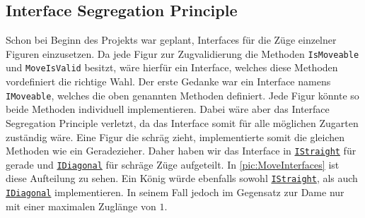 \documentclass[
10pt, %
a4paper, %
oneside, %
headinclude,footinclude, %
BCOR5mm, %
]{scrartcl}
\begin{document}
\begin{onehalfspace}
\subsection{Interface Segregation Principle}
Schon bei Beginn des Projekts war geplant, Interfaces für die Züge einzelner Figuren einzusetzen. Da jede Figur zur Zugvalidierung die Methoden \texttt{IsMoveable} und \texttt{MoveIsValid} besitzt, wäre hierfür ein Interface, welches diese Methoden vordefiniert die richtige Wahl. Der erste Gedanke war ein Interface namens \texttt{IMoveable}, welches die oben genannten Methoden definiert. Jede Figur könnte so beide Methoden individuell implementieren. Dabei wäre aber das Interface Segregation Principle verletzt, da das Interface somit für alle möglichen Zugarten zuständig wäre. Eine Figur die schräg zieht, implementierte somit die gleichen Methoden wie ein Geradezieher. Daher haben wir das Interface in \texttt{\href{https://github.com/schmida736/Chess-AdvancedSE/blob/main/Chess-AdvancedSE/Game\%20Elements/Pieces/IStraight.cs}{IStraight}} für gerade und \texttt{\href{https://github.com/schmida736/Chess-AdvancedSE/blob/main/Chess-AdvancedSE/Game\%20Elements/Pieces/IDiagonal.cs}{IDiagonal}} für schräge Züge aufgeteilt. In \autoref{pic:MoveInterfaces} ist diese Aufteilung zu sehen. Ein König würde ebenfalls sowohl \texttt{\href{https://github.com/schmida736/Chess-AdvancedSE/blob/main/Chess-AdvancedSE/Game\%20Elements/Pieces/IStraight.cs}{IStraight}}, als auch \texttt{\href{https://github.com/schmida736/Chess-AdvancedSE/blob/main/Chess-AdvancedSE/Game\%20Elements/Pieces/IDiagonal.cs}{IDiagonal}} implementieren. In seinem Fall jedoch im Gegensatz zur Dame nur mit einer maximalen Zuglänge von $1$.


\end{onehalfspace}
\end{document}
